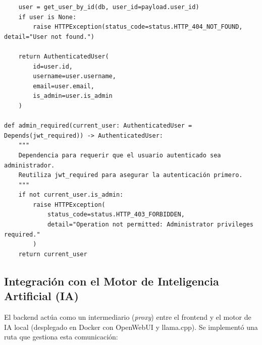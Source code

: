 \begin{lstlisting}
    user = get_user_by_id(db, user_id=payload.user_id)
    if user is None:
        raise HTTPException(status_code=status.HTTP_404_NOT_FOUND, detail="User not found.")

    return AuthenticatedUser(
        id=user.id,
        username=user.username,
        email=user.email,
        is_admin=user.is_admin
    )

def admin_required(current_user: AuthenticatedUser = Depends(jwt_required)) -> AuthenticatedUser:
    """
    Dependencia para requerir que el usuario autenticado sea administrador.
    Reutiliza jwt_required para asegurar la autenticación primero.
    """
    if not current_user.is_admin:
        raise HTTPException(
            status_code=status.HTTP_403_FORBIDDEN,
            detail="Operation not permitted: Administrator privileges required."
        )
    return current_user
\end{lstlisting}

\subsection{Integración con el Motor de Inteligencia Artificial (IA)}
\label{ssec:desarrollo_iter2_ai}

El backend actúa como un intermediario (\emph{proxy}) entre el frontend y el motor de IA local (desplegado en Docker con OpenWebUI y llama.cpp). Se implementó una ruta que gestiona esta comunicación:

